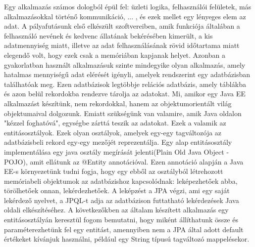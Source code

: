 \documentclass[centeredchapter]{thesis-ekf}
\theoremstyle{definition}
\theoremstyle{remark}
\begin{document}
Egy alkalmazás számos dologból épül fel: üzleti logika, felhasználói felületek, más alkalmazásokkal történő kommunikáció, ... , és ezek mellet egy lényeges elem az adat. A pályafutásunk első elkészült szoftvereiben, amik funkciója általában a felhasználó nevének és kedvenc állatának bekérésében kimerült, a kis adatmennyiség miatt, illetve az adat felhasználásának rövid időtartama miatt elegendő volt, hogy ezek csak a memóriában kapjanak helyet. Azonban a gyakorlatban használt alkalmazásuk szinte mindegyike olyan alkalmazás, amely hatalmas mennyiségű adat elérését igényli, amelyek rendszerint egy adatbázisban találhatóak meg. Ezen adatbázisok legtöbbje relációs adatbázis, amely táblákba és azon belül rekordokba rendezve tárolja az adatokat. Mi, amikor egy Java EE alkalmazást készítünk, nem rekordokkal, hanem az objektumorientált világ objektumaival dolgozunk. Emiatt szükségünk van valamire, amik Java oldalon "kézzel foghatóvá", egységbe zárttá teszik az adatokat. Ezek a valamik az entitásosztályok. Ezek olyan osztályok, amelyek egy-egy tagváltozója az adatbázisbeli rekord egy-egy mezőjét reprezentálja. Egy alap entitásosztály implementálása egy java osztály megírását jelenti(Plain Old Java Object - POJO), amit ellátunk az @Entity annotációval. Ezen annotáció alapján a Java EE-s környezetünk tudni fogja, hogy egy ebből az osztályból létrehozott memóriabeli objektumok az adatbázishoz kapcsolódnak: leképezhetőek abba, törölhetőek onnan, lekérdezhetőek. A leképzést a JPA végzi, ami egy saját lekérdező nyelvet, a  JPQL-t adja az adatbázison futtatható lekérdezések Java oldali elkészítéséhez. A következőkben az általam készített alkalmazás egy entitásosztályán keresztül fogom bemutatni, hogy miként állíthatunk össze és paraméterezhetünk fel egy entitást, amennyiben nem a JPA által adott default értékeket kívánjuk használni, például egy String típusú tagváltozó mappelésekor.

\newpage
\hypertarget{figure-service-entity}{}

\end{document}
